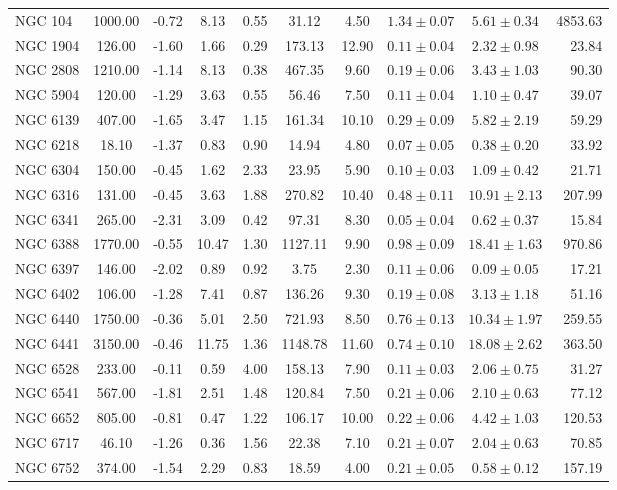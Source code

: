 \documentclass[doublespace,nopageskip]{VTthesis} %
\begin{document}
\begin{table}
{\begin{tabular}{lccccccccr}
NGC 104 & 1000.00 & -0.72 & 8.13 & 0.55 & 31.12 & 4.50 & $1.34 \pm 0.07$ & $5.61 \pm 0.34$ & 4853.63\\
NGC 1904 & 126.00 & -1.60 & 1.66 & 0.29 & 173.13 & 12.90 & $0.11 \pm 0.04$ & $2.32 \pm 0.98$ & 23.84\\
NGC 2808 & 1210.00 & -1.14 & 8.13 & 0.38 & 467.35 & 9.60 & $0.19 \pm 0.06$ & $3.43 \pm 1.03$ & 90.30\\
NGC 5904 & 120.00 & -1.29 & 3.63 & 0.55 & 56.46 & 7.50 & $0.11 \pm 0.04$ & $1.10 \pm 0.47$ & 39.07\\
NGC 6139 & 407.00 & -1.65 & 3.47 & 1.15 & 161.34 & 10.10 & $0.29 \pm 0.09$ & $5.82 \pm 2.19$ & 59.29\\
NGC 6218 & 18.10 & -1.37 & 0.83 & 0.90 & 14.94 & 4.80 & $0.07 \pm 0.05$ & $0.38 \pm 0.20$ & 33.92\\
NGC 6304 & 150.00 & -0.45 & 1.62 & 2.33 & 23.95 & 5.90 & $0.10 \pm 0.03$ & $1.09 \pm 0.42$ & 21.71\\
NGC 6316 & 131.00 & -0.45 & 3.63 & 1.88 & 270.82 & 10.40 & $0.48 \pm 0.11$ & $10.91 \pm 2.13$ & 207.99\\
NGC 6341 & 265.00 & -2.31 & 3.09 & 0.42 & 97.31 & 8.30 & $0.05 \pm 0.04$ & $0.62 \pm 0.37$ & 15.84\\
NGC 6388 & 1770.00 & -0.55 & 10.47 & 1.30 & 1127.11 & 9.90 & $0.98 \pm 0.09$ & $18.41 \pm 1.63$ & 970.86\\
NGC 6397 & 146.00 & -2.02 & 0.89 & 0.92 & 3.75 & 2.30 & $0.11 \pm 0.06$ & $0.09 \pm 0.05$ & 17.21\\
NGC 6402 & 106.00 & -1.28 & 7.41 & 0.87 & 136.26 & 9.30 & $0.19 \pm 0.08$ & $3.13 \pm 1.18$ & 51.16\\
NGC 6440 & 1750.00 & -0.36 & 5.01 & 2.50 & 721.93 & 8.50 & $0.76 \pm 0.13$ & $10.34 \pm 1.97$ & 259.55\\
NGC 6441 & 3150.00 & -0.46 & 11.75 & 1.36 & 1148.78 & 11.60 & $0.74 \pm 0.10$ & $18.08 \pm 2.62$ & 363.50\\
NGC 6528 & 233.00 & -0.11 & 0.59 & 4.00 & 158.13 & 7.90 & $0.11 \pm 0.03$ & $2.06 \pm 0.75$ & 31.27\\
NGC 6541 & 567.00 & -1.81 & 2.51 & 1.48 & 120.84 & 7.50 & $0.21 \pm 0.06$ & $2.10 \pm 0.63$ & 77.12\\
NGC 6652 & 805.00 & -0.81 & 0.47 & 1.22 & 106.17 & 10.00 & $0.22 \pm 0.06$ & $4.42 \pm 1.03$ & 120.53\\
NGC 6717 & 46.10 & -1.26 & 0.36 & 1.56 & 22.38 & 7.10 & $0.21 \pm 0.07$ & $2.04 \pm 0.63$ & 70.85\\
NGC 6752 & 374.00 & -1.54 & 2.29 & 0.83 & 18.59 & 4.00 & $0.21 \pm 0.05$ & $0.58 \pm 0.12$ & 157.19\\

\end{tabular}}
\end{table}
\end{document}
